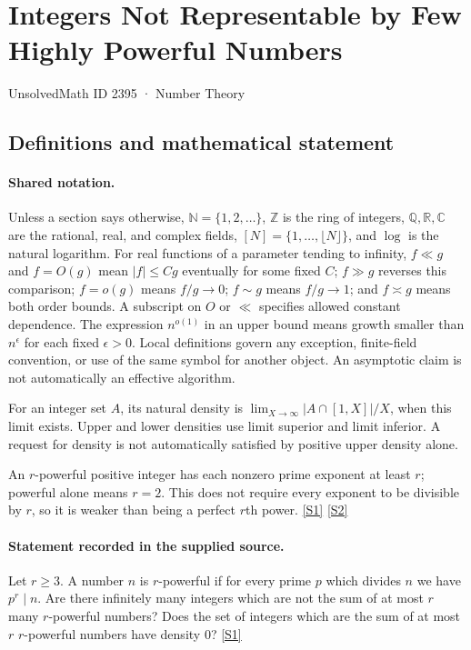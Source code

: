 \documentclass[11pt,a4paper]{article}
\newcommand{\N}{\mathbb{N}}
\newcommand{\Z}{\mathbb{Z}}
\newcommand{\Q}{\mathbb{Q}}
\newcommand{\R}{\mathbb{R}}
\newcommand{\C}{\mathbb{C}}
\newcommand{\sref}[2]{\hyperlink{source:#1:#2}{[S#2]}}
\begin{document}

\setcounter{section}{2394}

\section{Integers Not Representable by Few Highly Powerful Numbers}\label{2395}

{\small\sffamily UnsolvedMath ID 2395 · Number Theory}

\subsection{Definitions and mathematical statement}

\paragraph{Shared notation.}Unless a section says otherwise, $\N=\{1,2,\ldots\}$,
$\Z$ is the ring of integers, $\Q,\R,\C$ are the rational, real, and complex
fields, $[N]=\{1,\ldots,\lfloor N\rfloor\}$, and $\log$ is the natural
logarithm. For real functions of a parameter tending to infinity,
$f\ll g$ and $f=O(g)$ mean $|f|\leq Cg$ eventually for some fixed $C$;
$f\gg g$ reverses this comparison; $f=o(g)$ means $f/g\to0$;
$f\sim g$ means $f/g\to1$; and $f\asymp g$ means both order bounds.
A subscript on $O$ or $\ll$ specifies allowed constant dependence.
The expression $n^{o(1)}$ in an upper bound means growth smaller than
$n^\epsilon$ for each fixed $\epsilon>0$. Local definitions govern any
exception, finite-field convention, or use of the same symbol for another
object. An asymptotic claim is not automatically an effective algorithm.



For an integer set $A$, its natural density is $\lim_{X\to\infty}|A\cap[1,X]|/X$, when this limit exists. Upper and lower densities use limit superior and limit inferior. A request for density is not automatically satisfied by positive upper density alone.

An $r$-powerful positive integer has each nonzero prime exponent at least $r$; powerful alone means $r=2$. This does not require every exponent to be divisible by $r$, so it is weaker than being a perfect $r$th power. \sref{2395}{1} \sref{2395}{2}

\paragraph{Statement recorded in the supplied source.}
Let $r\geq 3$. A number $n$ is $r$-powerful if for every prime $p$ which divides $n$ we have $p^r\mid n$.
Are there infinitely many integers which are not the sum of at most $r$ many $r$-powerful numbers? Does the set of integers which are the sum of at most $r$ $r$-powerful numbers have density $0$? \sref{2395}{1}
\end{document}
